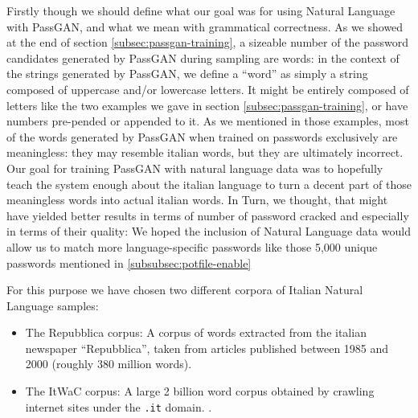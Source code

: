 Firstly though we should define what our goal was for using Natural Language with PassGAN, and what we mean with grammatical correctness. 
As we showed at the end of section \ref{subsec:passgan-training}, a sizeable number of the password candidates generated by PassGAN during sampling are words: in the context of the strings generated by PassGAN, we define a \enquote{word} as simply a string composed of uppercase and/or lowercase letters. It might be entirely composed of letters like the two examples we gave in section \ref{subsec:passgan-training}, or have numbers pre-pended or appended to it. As we mentioned in those examples, most of the words generated by PassGAN when trained on passwords exclusively are meaningless: they may resemble italian words, but they are ultimately incorrect.
Our goal for training PassGAN with natural language data was to hopefully teach the system enough about the italian language to turn a decent part of those meaningless words into actual italian words. In Turn, we thought, that might have yielded better results in terms of number of password cracked and especially in terms of their quality: We hoped the inclusion of Natural Language data would allow us to match more language-specific passwords like those 5,000 unique passwords mentioned in \ref{subsubsec:potfile-enable}   

For this purpose we have chosen two different corpora of Italian Natural Language samples: 
\begin{itemize}
    \item The Repubblica corpus: A corpus of words extracted from the italian newspaper \enquote{Repubblica}, taken from articles published between 1985 and 2000 (roughly 380 million words).\cite{repubblica_corpus}
    \item The ItWaC corpus: A large 2 billion word corpus obtained by crawling internet sites under the \texttt{.it} domain. \cite{itwac_corpus}.  
\end{itemize}

